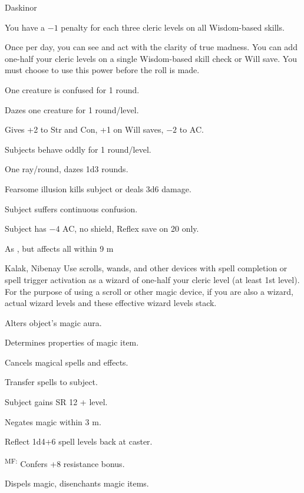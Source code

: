 {Daskinor}
{You have a $-1$ penalty for each three cleric levels on all Wisdom-based skills.

Once per day, you can see and act with the clarity of true madness. You can add one-half your cleric levels on a single Wisdom-based skill check or Will save. You must choose to use this power before the roll is made.}
{
	\item {} One creature is confused for 1 round.
	\item {} Dazes one creature for 1 round/level.
	\item {} Gives +2 to Str and Con, +1 on Will saves, $-2$ to AC.
	\item {} Subjects behave oddly for 1 round/level.
	\item {} One ray/round, dazes 1d3 rounds.
	\item {} Fearsome illusion kills subject or deals 3d6 damage.
	\item {} Subject suffers continuous confusion.
	\item {} Subject has $-4$ AC, no shield, Reflex save on 20 only.
	\item {} As , but affects all within 9 m
}

{Kalak, Nibenay}
{Use scrolls, wands, and other devices with spell completion or spell trigger activation as a wizard of one-half your cleric level (at least 1st level). For the purpose of using a scroll or other magic device, if you are also a wizard, actual wizard levels and these effective wizard levels stack.}
{
	\item {} Alters object's magic aura.
	\item {} Determines properties of magic item.
	\item {} Cancels magical spells and effects.
	\item {} Transfer spells to subject.
	\item {} Subject gains SR 12 + level.
	\item {} Negates magic within 3 m.
	\item {} Reflect 1d4+6 spell levels back at caster.
	\item {}\textsuperscript{M}\textsuperscript{F:} Confers +8 resistance bonus.
	\item {} Dispels magic, disenchants magic items.
}

